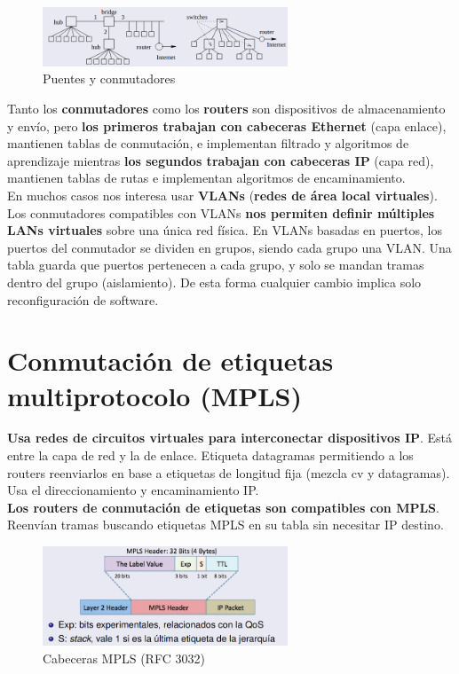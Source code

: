 \documentclass{article}
\begin{document}
\begin{figure}[h]
    \centering
    \includegraphics[width=0.65\textwidth]{img-t5/img_458_29.png}
    \caption{Puentes y conmutadores}
\end{figure}

\newpage

Tanto los \textbf{conmutadores} como los \textbf{routers} son dispositivos de almacenamiento y envío, pero \textbf{los primeros trabajan con cabeceras Ethernet} (capa enlace), mantienen tablas de conmutación, e implementan filtrado y algoritmos de aprendizaje mientras \textbf{los segundos trabajan con cabeceras IP} (capa red), mantienen tablas de rutas e implementan algoritmos de encaminamiento. \\
En muchos casos nos interesa usar \textbf{VLANs} (\textbf{redes de área local virtuales}). Los conmutadores compatibles con VLANs \textbf{nos permiten definir múltiples LANs virtuales} sobre una única red física. En VLANs basadas en puertos, los puertos del conmutador se dividen en grupos, siendo cada grupo una VLAN. Una tabla guarda que puertos pertenecen a cada grupo, y solo se mandan tramas dentro del grupo (aislamiento). De esta forma cualquier cambio implica solo reconfiguración de software.

\section{Conmutación de etiquetas multiprotocolo (MPLS)}
\textbf{Usa redes de circuitos virtuales para interconectar dispositivos IP}. Está entre la capa de red y la de enlace. Etiqueta datagramas permitiendo a los routers reenviarlos en base a etiquetas de longitud fija (mezcla cv y datagramas). Usa el direccionamiento y encaminamiento IP. \\
\textbf{Los routers de conmutación de etiquetas son compatibles con MPLS}. Reenvían tramas buscando etiquetas MPLS en su tabla sin necesitar IP destino.

\begin{figure}[h]
    \centering
    \includegraphics[width=0.65\textwidth]{img-t5/img_176_10.png}
    \caption{Cabeceras MPLS (RFC 3032)}
\end{figure}
\end{document}
